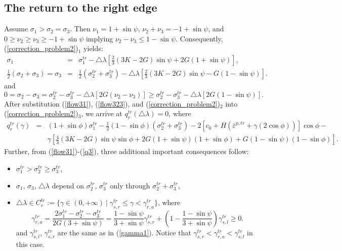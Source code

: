 \documentclass[a4paper,12pt]{article}
\theoremstyle{remark}
\numberwithin{equation}{section}
\begin{document}
\subsection{The return to the right edge} 

Assume $\sigma_1>\sigma_2=\sigma_3$. 
Then $\nu_1=1+\sin\psi$, $\nu_2+\nu_3=-1+\sin\psi$, and $0\geq \nu_2\geq \nu_3\geq -1+\sin\psi$ implying $\nu_2-\nu_3\leq1-\sin\psi$.  Consequently, (\ref{correction_problem2})$_1$ yields:
\begin{eqnarray}
\sigma_1&=&\sigma_1^{tr}-\triangle\lambda\left[\frac{2}{3}(3K-2G)\sin\psi+2G(1+\sin\psi)\right],\label{flow31}\\
\frac{1}{2}(\sigma_2+\sigma_3)=\sigma_3&=&\frac{1}{2}(\sigma_2^{tr}+\sigma_3^{tr})-\triangle\lambda\left[\frac{2}{3}(3K-2G)\sin\psi- G(1-\sin\psi)\right].\label{flow323}
\end{eqnarray}
and
\begin{equation}
0=\sigma_2-\sigma_3=\sigma_2^{tr}-\sigma_3^{tr}-\triangle\lambda[2G(\nu_2-\nu_3)]\geq\sigma_2^{tr}-\sigma_3^{tr}-\triangle\lambda[2G(1-\sin\psi)].
\label{est_right}
\end{equation}
After substitution (\ref{flow31}), (\ref{flow323}), and (\ref{correction_problem2})$_2$ into (\ref{correction_problem2})$_3$, we arrive at $q_r^{tr}(\triangle\lambda)=0$, where 
\begin{eqnarray}
q^{tr}_r(\gamma)&=&(1+\sin\phi)\sigma_1^{tr}-\frac{1}{2}(1-\sin\phi)(\sigma_2^{tr}+\sigma_3^{tr})-2\left[c_0+H\left(\bar{\varepsilon}^{p,tr}+\gamma (2\cos\phi)\right)\right]\cos\phi-\nonumber\\
&&\gamma\left[\frac{4}{3}(3K-2G)\sin\psi\sin\phi+ 2G(1+\sin\psi)(1+\sin\phi)+ G(1-\sin\psi)(1-\sin\phi)\right].\qquad
\label{q3}
\end{eqnarray}
Further, from (\ref{flow31})-(\ref{q3}),  three additional important consequences follow:
\begin{itemize}
\item $\sigma_1^{tr}>\sigma_2^{tr}\geq\sigma_3^{tr}$,
\item $\sigma_1$, $\sigma_3$, $\triangle\lambda$ depend on $\sigma^{tr}_2$, $\sigma^{tr}_3$ only through $\sigma^{tr}_2+\sigma^{tr}_3$,
\item $\triangle\lambda\in C^{tr}_r:=\{\gamma\in(0,+\infty)\ |\; \gamma^{tr}_{s,r}\leq\gamma<\gamma^{tr}_{r,a}\}$, where
\begin{equation}
\gamma^{tr}_{r,a}=\frac{2\sigma_1^{tr}-\sigma_2^{tr}-\sigma_3^{tr}}{2G(3+\sin\psi)}=\frac{1-\sin\psi}{3+\sin\psi}\gamma^{tr}_{s,r}+\left(1-\frac{1-\sin\psi}{3+\sin\psi}\right)\gamma^{tr}_{s,l}\geq0.
\label{gamma3}
\end{equation}
and $\gamma^{tr}_{s,l}$, $\gamma^{tr}_{s,r}$ are the same as in (\ref{gamma1}). Notice that $\gamma^{tr}_{s,r}<\gamma^{tr}_{r,a}<\gamma^{tr}_{s,l}$ in this case.
\end{itemize}
\end{document}
